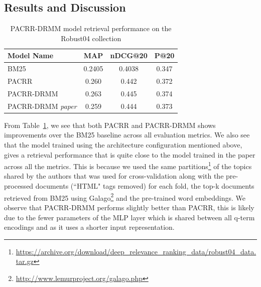 \subsection{Results and Discussion}
\begin{table}[]
    \centering
    \begin{tabular}{lccc}
    \toprule
        Model Name & MAP & nDCG@20 & P@20 \\
        \midrule
        BM25 & 0.2405 & 0.4038 & 0.347 \\
        PACRR & 0.260 & 0.442 & 0.372\\
        PACRR-DRMM & 0.263 & 0.445 & 0.374 \\
        PACRR-DRMM \textit{paper} & 0.259 & 0.444 & 0.373 \\
    \bottomrule
    \end{tabular}
    \caption{PACRR-DRMM model retrieval performance on the Robust04 collection}
    \label{tab:pacrr_drmm_eval}
\end{table}
From Table~\ref{tab:pacrr_drmm_eval}, we see that both PACRR and PACRR-DRMM shows improvements over the BM25 baseline across all evaluation metrics. We also see that the model trained using the architecture configuration mentioned above, gives a retrieval performance that is quite close to the model trained in the paper across all the metrics. This is because we used the same partitions\footnote{\url{https://archive.org/download/deep_relevance_ranking_data/robust04_data.tar.gz}} of the topics shared by the authors that was used for cross-validation along with the pre-processed documents (``HTML" tags removed) for each fold, the top-k documents retrieved from BM25 using Galago\footnote{\url{http://www.lemurproject.org/galago.php}} and the pre-trained word embeddings. We observe that PACRR-DRMM performs slightly better than PACRR, this is likely due to the fewer parameters of the MLP layer which is shared between all q-term encodings and as it uses a shorter input representation.




